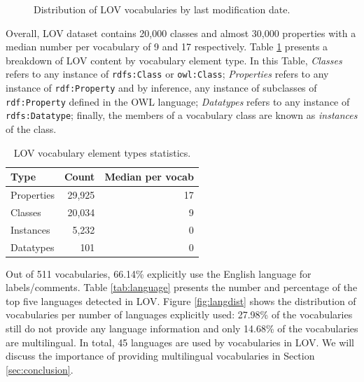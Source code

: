 \documentclass{iosart2c}
\begin{document}
\begin{figure}[htb]
\resizebox{\linewidth}{!}{}
\caption{\label{fig:modifevol} Distribution of LOV vocabularies by last modification date.}
\end{figure}


Overall, LOV dataset contains 20,000 classes and almost 30,000 properties with a median number per vocabulary of 9 and 17 respectively. Table \ref{tab:elements} presents a breakdown of LOV content by vocabulary element type. In this Table,  \emph{Classes} refers to any instance of {\small\texttt{rdfs:Class}} or {\small\texttt{owl:Class}}; \emph{Properties} refers to any instance of {\small\texttt{rdf:Property}} and by inference, any instance of subclasses of {\small\texttt{rdf:Property}} defined in the OWL language; \emph{Datatypes} refers to any instance of {\small\texttt{rdfs:Datatype}}; finally, the members of a vocabulary class are known as \emph{instances} of the class.

\begin{table}[htb]
\caption{LOV vocabulary element types statistics.}
\begin{tabular}{lrr}
\hline
\textbf{Type} & \textbf{Count} &  \textbf{Median per vocab} \\ \hline
Properties & 29,925 & 17 \\
Classes & 20,034 & 9 \\
Instances & 5,232 & 0 \\
Datatypes & 101 & 0 \\
\hline  
\end{tabular}
\label{tab:elements}
\end{table}

Out of 511 vocabularies, 66.14\% explicitly use the English language for labels/comments. Table \ref{tab:language} presents the number and percentage of the top five languages detected in LOV. Figure \ref{fig:langdist} shows the distribution of vocabularies per number of languages explicitly used: 27.98\% of the vocabularies still do not provide any language information and only 14.68\% of the vocabularies are multilingual. In total, 45 languages are used by vocabularies in LOV. We will discuss the importance of providing multilingual vocabularies in Section \ref{sec:conclusion}.
\end{document}
